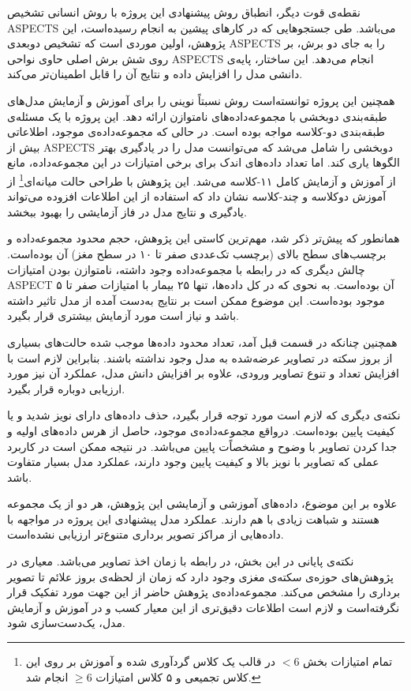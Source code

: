 نقطه‌ی قوت دیگر، انطباق روش پیشنهادی این پروژه با روش انسانی تشخیص ASPECTS می‌باشد.
طی جستجو‌هایی که در کارهای پیشین به انجام رسیده‌است،
این پژوهش، اولین موردی است که تشخیص دو‌بعدی ASPECTS را به جای دو برش، بر روی شش برش اصلی حاوی نواحی ASPECTS انجام می‌دهد.
این ساختار، پایه‌ی دانشی مدل را افزایش داده و نتایج آن را قابل اطمینان‌تر می‌کند.

همچنین این پروژه توانسته‌است روش نسبتاً نوینی را برای 
آموزش و آزمایش مدل‌های طبقه‌بندی دوبخشی با مجموعه‌داده‌‌های نامتوازن ارائه دهد.
 این پروژه با یک مسئله‌ی طبقه‌بندی دو-کلاسه مواجه بوده است.
 در حالی که مجموعه‌داده‌ی موجود، اطلاعاتی بیش از ASPECTS دوبخشی را شامل می‌شد
 که می‌توانست مدل را در یادگیری بهتر الگوها یاری کند.
 اما تعداد داده‌های اندک برای برخی امتیازات در این مجموعه‌داده، مانع از آموزش و آزمایش کامل ۱۱-کلاسه می‌شد.
 این پژوهش با 
 طراحی حالت میانه‌ای\footnote{تمام امتیازات بخش $<6$ در قالب یک کلاس گردآوری شده و آموزش بر روی این کلاس تجمیعی و ۵ کلاس امتیازات $\geq 6$ انجام شد.}
 از آموزش دو‌کلاسه و چند-کلاسه 
 نشان داد که استفاده از این اطلاعات افزوده می‌تواند 
 یادگیری و نتایج مدل در فاز آزمایشی را بهبود ببخشد.

همانطور که پیش‌تر ذکر شد، مهم‌ترین کاستی این پژوهش، حجم محدود مجموعه‌داده و برچسب‌های سطح بالای (برچسب تک‌عددی صفر تا ۱۰ در سطح مغز) آن بوده‌است.
چالش دیگری که در رابطه با مجموعه‌داده وجود داشته، نامتوازن بودن امتیازات ASPECT آن بوده‌است.
به نحوی که در کل داده‌ها، تنها ۲۵ بیمار با امتیازات صفر تا ۵ موجود بوده‌است.
این موضوع ممکن است بر نتایج به‌دست آمده از مدل تاثیر داشته باشد و نیاز است مورد آزمایش بیشتری قرار بگیرد.

همچنین چنانکه در قسمت قبل آمد، تعداد محدود داده‌ها موجب شده حالت‌های بسیاری از بروز سکته در تصاویر عرضه‌شده به مدل وجود نداشته باشند.
بنابراین لازم است با افزایش تعداد و تنوع تصاویر ورودی، 
علاوه بر افزایش دانش مدل، عملکرد آن نیز مورد ارزیابی دوباره قرار بگیرد.

نکته‌ی دیگری که لازم است مورد توجه قرار بگیرد، حذف داده‌های دارای نویز شدید و یا کیفیت پایین بوده‌است.
درواقع مجموعه‌داده‌‌ی موجود، حاصل از هرس داده‌های اولیه و جدا کردن تصاویر با وضوح و مشخصاًت پایین می‌باشد.
در نتیجه ممکن است در کاربرد عملی که تصاویر با نویز بالا و کیفیت پایین وجود دارند، عملکرد مدل بسیار متفاوت باشد.

علاوه بر این موضوع، داده‌های آموزشی و آزمایشی
این پژوهش، هر دو از یک مجموعه هستند و شباهت زیادی با هم دارند.
عملکرد مدل پیشنهادی این پروژه در مواجهه با داده‌هایی از مراکز تصویر برداری متنوع‌تر ارزیابی نشده‌است.

نکته‌ی پایانی در این بخش، در رابطه با زمان اخذ تصاویر می‌باشد.
معیاری در پژوهش‌های حوزه‌ی سکته‌ی مغزی وجود دارد که زمان از لحظه‌ی بروز علائم تا تصویر برداری را مشخص می‌کند.
مجموعه‌داده‌ی پژوهش حاضر از این جهت مورد تفکیک قرار نگرفته‌است و لازم است اطلاعات دقیق‌تری از این معیار کسب و در آموزش و آزمایش مدل، یک‌دست‌سازی شود.

